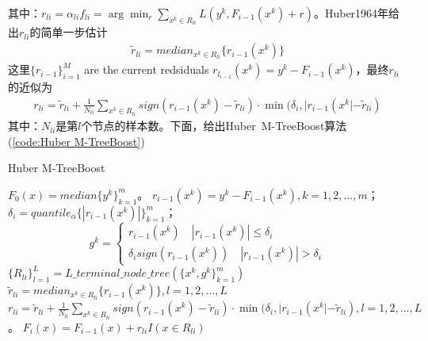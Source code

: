               其中：$r_{li} = \alpha_{li}f_{li} = \arg\min_r\sum_{x^k\in R_{li}}L(y^k,F_{i-1}(x^k)+r)  $。Huber1964年给出$r_{li}$的简单一步估计
              \begin{align*}
              \tilde{r}_{li} = median_{x^k\in R_{li}} \{r_{{i-1}}(x^k)\}
              \end{align*}
              这里$\{r_{i-1}\}_{i=1}^M$ are the current redsiduals $r_{l_{i-1}}(x^k) = y^k - F_{i-1}(x^k)$，最终$r_{li}$的近似为
              \begin{align*}
              r_{li} = \tilde{r}_{li} + \frac{1}{N_{li}} \sum_{x^k\in R_{li}}sign (r_{i-1}(x^k) - \tilde{r}_{li})\cdot \min(\delta_i,|r_{i-1}(x^k| - \tilde{r}_{li})
              \end{align*}
              其中：$N_{li}$是第$l$个节点的样本数。下面，给出Huber\ M-TreeBoost算法(\ref{code:Huber M-TreeBoost})
              \begin{algorithm}[H]
                  \caption{Huber M-TreeBoost}\label{code:Huber M-TreeBoost}
                  \begin{algorithmic}[1]
                      \State $F_0(x) = median\{y^k\}_{k=1}^m$。
                          \State $r_{i-1}(x^k) = y^k - F_{i-1}(x^k),k=1,2,\dots,m$；
                          \State $\delta_i = quantile_\alpha\{|r_{i-1}(x^k)|\}_{k=1}^m$；
                          \State \[ g^k = \left\{
                          \begin{aligned}
                          r_{i-1}(x^k) \quad |r_{i-1}(x^k)| \leqslant \delta_i\\
                          \delta_isign(r_{i-1}(x^k))\quad |r_{i-1}(x^k)|>\delta_i
                          \end{aligned}
                          \right. \]
                          \State $\{R_{li}\}_{l=1}^L = L\_terminal\_node\_tree(\{x^k,g^k\}_{k=1}^m)$
                          \State $\tilde{r}_{li} = median_{x^k\in R_{li}} \{r_{{i-1}}(x^k)\} ,l=1,2,\dots,L$
                          \State $r_{li} = \tilde{r}_{li} + \frac{1}{N_{li}} \sum\limits_{x^k\in R_{li}}sign (r_{i-1}(x^k) - \tilde{r}_{li})\cdot \min(\delta_i,|r_{i-1}(x^k| - \tilde{r}_{li}),l = 1,2,\dots,L$ 。
                          \State $F_i(x) = F_{i-1}(x) + r_{li}I(x\in R_{li})$
                      \EndFor
                  \end{algorithmic}
              \end{algorithm}
